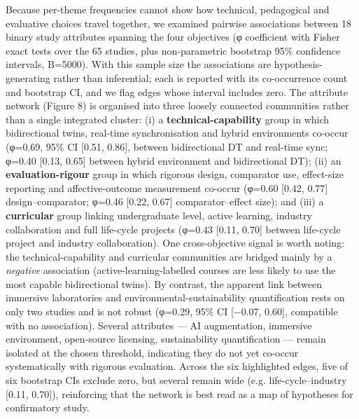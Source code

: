 Because per-theme frequencies cannot show how technical, pedagogical and
evaluative choices travel together, we examined pairwise associations between 18
binary study attributes spanning the four objectives (φ coefficient with Fisher
exact tests over the 65 studies, plus non-parametric bootstrap 95\% confidence
intervals, B=5000).
With this sample size the associations are hypothesis-generating rather than
inferential; each is reported with its co-occurrence count and bootstrap CI, and
we flag edges whose interval includes zero. The attribute network (Figure 8) is
organised into three loosely connected communities rather than a single
integrated cluster: (i) a \textbf{technical-capability} group in which bidirectional
twins, real-time synchronisation and hybrid environments co-occur (φ=0.69,
95\% CI {[}0.51, 0.86{]}, between bidirectional DT and real-time sync; φ=0.40
{[}0.13, 0.65{]} between hybrid environment and bidirectional DT); (ii) an
\textbf{evaluation-rigour} group in which rigorous design, comparator use,
effect-size reporting and affective-outcome measurement co-occur (φ=0.60
{[}0.42, 0.77{]} design--comparator; φ=0.46 {[}0.22, 0.67{]} comparator--effect size);
and (iii) a \textbf{curricular} group linking undergraduate level, active learning,
industry collaboration and full life-cycle projects (φ=0.43 {[}0.11, 0.70{]} between
life-cycle project and industry collaboration). One cross-objective signal is
worth noting: the technical-capability and curricular communities are bridged
mainly by a \emph{negative} association (active-learning-labelled courses are less
likely to use the most capable bidirectional twins). By contrast, the apparent
link between immersive laboratories and environmental-sustainability
quantification rests on only two studies and is not robust (φ=0.29, 95\% CI
{[}−0.07, 0.60{]}, compatible with no association). Several attributes --- AI
augmentation, immersive environment, open-source licensing, sustainability
quantification --- remain isolated at the chosen threshold, indicating they do not
yet co-occur systematically with rigorous evaluation. Across the six highlighted
edges, five of six bootstrap CIs exclude zero, but several remain wide (e.g.
life-cycle--industry {[}0.11, 0.70{]}), reinforcing that the network is best read as
a map of hypotheses for confirmatory study.

